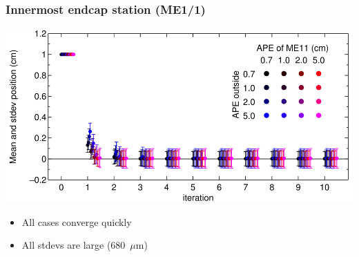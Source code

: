\documentclass[compress]{beamer}
\begin{document}
\begin{frame}
\frametitle{Innermost endcap station (ME1/1)}
\begin{center}
\includegraphics[width=\linewidth]{me11_meanstdev.png}
\end{center}

\vspace{-0.5 cm}
\begin{itemize}
\item All cases converge quickly
\item All stdevs are large (680~$\mu$m)
\end{itemize}
\end{frame}
\end{document}
